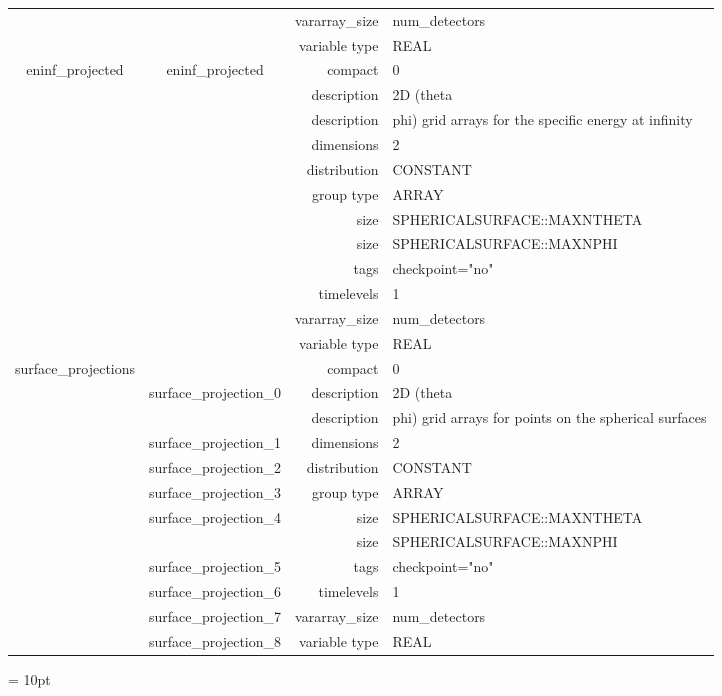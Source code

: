 \begin{tabular*}{150mm}{|c|c@{\extracolsep{\fill}}|rl|}
 &  & vararray\_size & num\_detectors \\ 
 &  & variable type & REAL \\ 
\hline 
eninf\_projected & eninf\_projected & compact & 0 \\ 
 &  & description & 2D (theta \\ 
& ~ & description & phi) grid arrays for the specific energy at infinity \\ 
 &  & dimensions & 2 \\ 
 &  & distribution & CONSTANT \\ 
 &  & group type & ARRAY \\ 
 &  & size & SPHERICALSURFACE::MAXNTHETA \\ 
& ~ & size & SPHERICALSURFACE::MAXNPHI \\ 
 &  & tags & checkpoint="no" \\ 
 &  & timelevels & 1 \\ 
 &  & vararray\_size & num\_detectors \\ 
 &  & variable type & REAL \\ 
\hline 
surface\_projections &  & compact & 0 \\ 
 & surface\_projection\_0 & description & 2D (theta \\ 
& ~ & description & phi) grid arrays for points on the spherical surfaces \\ 
 & surface\_projection\_1 & dimensions & 2 \\ 
 & surface\_projection\_2 & distribution & CONSTANT \\ 
 & surface\_projection\_3 & group type & ARRAY \\ 
 & surface\_projection\_4 & size & SPHERICALSURFACE::MAXNTHETA \\ 
& ~ & size & SPHERICALSURFACE::MAXNPHI \\ 
 & surface\_projection\_5 & tags & checkpoint="no" \\ 
 & surface\_projection\_6 & timelevels & 1 \\ 
 & surface\_projection\_7 & vararray\_size & num\_detectors \\ 
 & surface\_projection\_8 & variable type & REAL \\ 
\hline 
\end{tabular*} 



\vspace{5mm}\parskip = 10pt 
